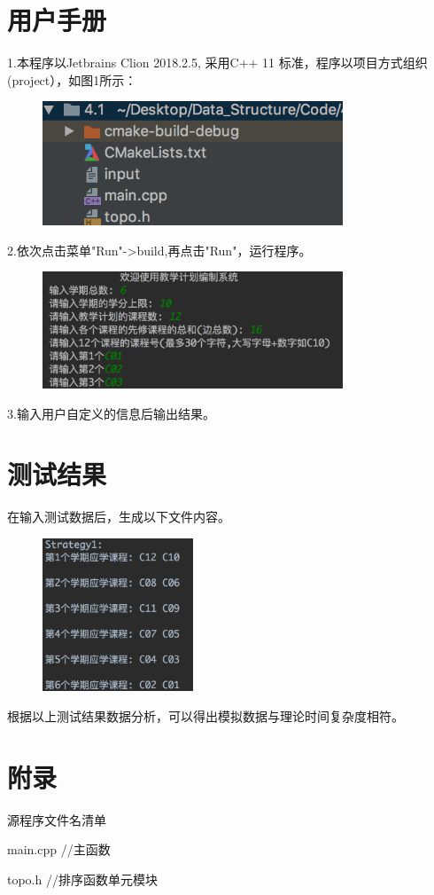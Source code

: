 \documentclass[paper=a4,UTF8,fontsize=11pt]{scrartcl} %
\numberwithin{equation}{section} %
\numberwithin{figure}{section} %
\numberwithin{table}{section} %
\begin{document}
\section{用户手册}
1.本程序以Jetbrains Clion 2018.2.5, 采用C++ 11 标准，程序以项目方式组织(project），如图1所示：
\begin{figure}[h]
    \centering
    \includegraphics[width=0.8\textwidth]{41project.png}
\end{figure}

\newpage

2.依次点击菜单"Run"->build,再点击"Run"，运行程序。

\begin{figure}[h]
    \centering
    \includegraphics[width=0.8\textwidth]{interface41.png}
\end{figure}



3.输入用户自定义的信息后输出结果。

\section{测试结果}

在输入测试数据后，生成以下文件内容。

\begin{figure}[h]
    \centering
    \includegraphics[width=0.4\textwidth]{result41.png}
\end{figure}

	根据以上测试结果数据分析，可以得出模拟数据与理论时间复杂度相符。

\section{附录}

源程序文件名清单

main.cpp               \qquad \quad  //主函数

topo.h            \qquad \qquad //排序函数单元模块
\end{document}
